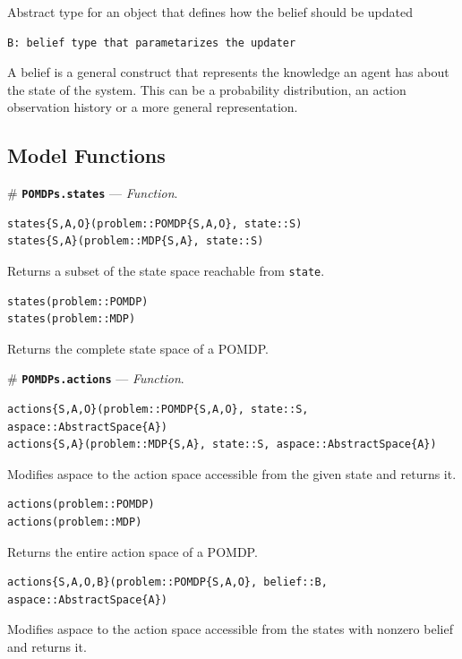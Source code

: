 \documentclass[12pt,]{article}
\begin{document}
Abstract type for an object that defines how the belief should be
updated

\begin{verbatim}
B: belief type that parametarizes the updater
\end{verbatim}

A belief is a general construct that represents the knowledge an agent
has about the state of the system. This can be a probability
distribution, an action observation history or a more general
representation.

\subsection{Model Functions}\label{model-functions}

\# \textbf{\texttt{POMDPs.states}} --- \emph{Function}.

\begin{verbatim}
states{S,A,O}(problem::POMDP{S,A,O}, state::S)
states{S,A}(problem::MDP{S,A}, state::S)
\end{verbatim}

Returns a subset of the state space reachable from \texttt{state}.

\begin{verbatim}
states(problem::POMDP)
states(problem::MDP)
\end{verbatim}

Returns the complete state space of a POMDP.

\# \textbf{\texttt{POMDPs.actions}} --- \emph{Function}.

\begin{verbatim}
actions{S,A,O}(problem::POMDP{S,A,O}, state::S, aspace::AbstractSpace{A})
actions{S,A}(problem::MDP{S,A}, state::S, aspace::AbstractSpace{A})
\end{verbatim}

Modifies aspace to the action space accessible from the given state and
returns it.

\begin{verbatim}
actions(problem::POMDP)
actions(problem::MDP)
\end{verbatim}

Returns the entire action space of a POMDP.

\begin{verbatim}
actions{S,A,O,B}(problem::POMDP{S,A,O}, belief::B, aspace::AbstractSpace{A})
\end{verbatim}

Modifies aspace to the action space accessible from the states with
nonzero belief and returns it.
\end{document}

